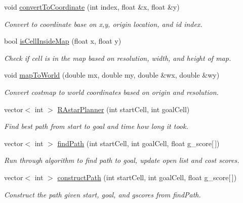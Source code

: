 \begin{DoxyCompactItemize}
void \hyperlink{classRAstar__planner_1_1RAstarPlannerROS_a1046296d428b694e517ef25cac423846}{convert\-To\-Coordinate} (int index, float \&x, float \&y)
\begin{DoxyCompactList}\small\item\em Convert to coordinate base on x,y, origin location, and id index. \end{DoxyCompactList}\item 
bool \hyperlink{classRAstar__planner_1_1RAstarPlannerROS_a1d3f1b7aed836e648645dd696823193b}{is\-Cell\-Inside\-Map} (float x, float y)
\begin{DoxyCompactList}\small\item\em Check if cell is in the map based on resolution, width, and height of map. \end{DoxyCompactList}\item 
void \hyperlink{classRAstar__planner_1_1RAstarPlannerROS_a5bb178849971d2425519d247874cfbd9}{map\-To\-World} (double mx, double my, double \&wx, double \&wy)
\begin{DoxyCompactList}\small\item\em Convert costmap to world coordinates based on origin and resolution. \end{DoxyCompactList}\item 
vector$<$ int $>$ \hyperlink{classRAstar__planner_1_1RAstarPlannerROS_a645d6e916622ae9151721dd5188389b9}{R\-Astar\-Planner} (int start\-Cell, int goal\-Cell)
\begin{DoxyCompactList}\small\item\em Find best path from start to goal and time how long it took. \end{DoxyCompactList}\item 
vector$<$ int $>$ \hyperlink{classRAstar__planner_1_1RAstarPlannerROS_af76635e270a26e8e3da8fa9a9c228377}{find\-Path} (int start\-Cell, int goal\-Cell, float g\-\_\-score\mbox{[}$\,$\mbox{]})
\begin{DoxyCompactList}\small\item\em Run through algorithm to find path to goal, update open list and cost scores. \end{DoxyCompactList}\item 
vector$<$ int $>$ \hyperlink{classRAstar__planner_1_1RAstarPlannerROS_a6976421411cfe98a8d426d6f9c68f436}{construct\-Path} (int start\-Cell, int goal\-Cell, float g\-\_\-score\mbox{[}$\,$\mbox{]})
\begin{DoxyCompactList}\small\item\em Construct the path given start, goal, and gscores from find\-Path. \end{DoxyCompactList}\item 

\end{DoxyCompactItemize}
